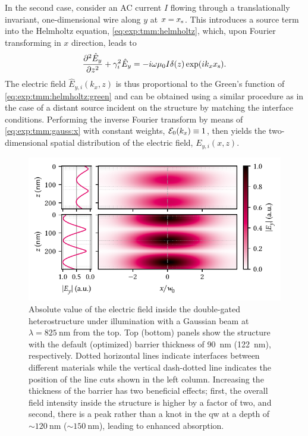In the second case, \citet{Langevin2024} consider an AC current $I$ flowing through a translationally invariant, one-dimensional wire along $y$ at $x=x_{\mathrm{s}}$.
This introduces a source term into the Helmholtz equation, \cref{eq:exp:tmm:helmholtz}, which, upon Fourier transforming in $x$ direction, leads to
\begin{equation}\label{eq:exp:tmm:helmholtz:green}
    \pdv[2]{\hat{E}_y}{z} + \gamma_i^2\hat{E}_y = -i\omega\mu_0 I\delta(z)\exp(i k_x x_{\mathrm{s}}).
\end{equation}
The electric field $\hat{E}_{y,i}(k_x, z)$ is thus proportional to the Green's function of \cref{eq:exp:tmm:helmholtz:green} and can be obtained using a similar procedure as in the case of a distant source incident on the structure by matching the interface conditions.
Performing the inverse Fourier transform by means of \cref{eq:exp:tmm:gauss:x} with constant weights, $\mathcal{E}_0(k_x)\equiv 1$, then yields the two-dimensional spatial distribution of the electric field, $E_{y,i}(x, z)$.

\begin{figure}
    \centering
    \includegraphics{img/pdf/experiment/tmm_field}
    \caption[]{
        Absolute value of the electric field inside the double-gated heterostructure under illumination with a Gaussian beam at $\lambda=\qty{825}{\nano\meter}$ from the top.
        Top (bottom) panels show the structure with the default (optimized) barrier thickness of \qty{90}{\nano\meter} (\qty{122}{\nano\meter}), respectively.
        Dotted horizontal lines indicate interfaces between different materials while the vertical dash-dotted line indicates the position of the line cuts shown in the left column.
        Increasing the thickness of the barrier has two beneficial effects; first, the overall field intensity inside the structure is higher by a factor of two, and second, there is a peak rather than a knot in the \gls{qw} at a depth of $\sim\qty{120}{\nano\meter}$ ($\sim\qty{150}{\nano\meter}$), leading to enhanced absorption.
    }
    \label{fig:exp:tmm:field}
\end{figure}

